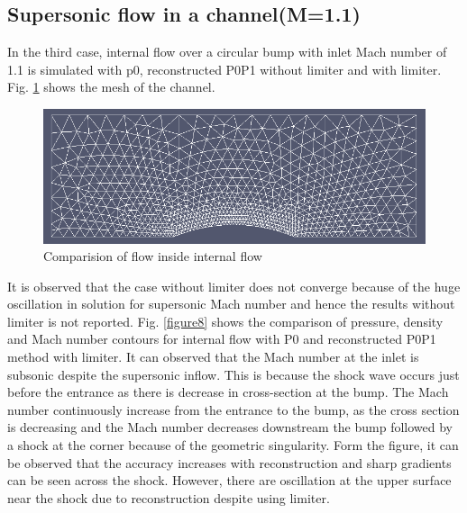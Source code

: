 \documentclass[12pt]{elsarticle}
\begin{document}
	\subsection{Supersonic flow in a channel(M=1.1)}
	In the third case, internal flow over a circular bump with inlet Mach number of 1.1 is simulated with p0, reconstructed P0P1 without limiter and with limiter. Fig. \ref{bumpfig} shows the mesh of the channel. 
	
	\begin{figure}[ht]
		\centering
		\includegraphics[width=1\linewidth]{bum_mesh_png}
		\caption{Comparision of flow inside internal flow}
		\label{bumpfig}
	\end{figure}
	
	It is observed that the case without limiter does not converge because of the huge oscillation in solution for supersonic Mach number and hence the results without limiter is not reported. Fig. \ref{figure8} shows the comparison of pressure, density and Mach number contours for internal flow with P0 and reconstructed P0P1 method with limiter. It can observed that the Mach number at the inlet is subsonic despite the supersonic inflow. This is because the shock wave occurs just before the entrance as there is decrease in cross-section at the bump.\newline
	\newline
	The Mach number continuously increase from the entrance to the bump, as the cross section is decreasing and the Mach number decreases downstream the bump followed by a shock at the corner because of the geometric singularity. Form the figure, it can be observed that the accuracy increases with reconstruction and sharp gradients can be seen across the shock. However, there are oscillation at the upper surface near the shock due to reconstruction despite using limiter.
	\clearpage
	
\end{document}
